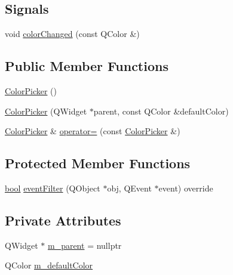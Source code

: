 \subsection*{Signals}
\begin{DoxyCompactItemize}
\item 
void \mbox{\hyperlink{class_q_g_b_a_1_1_color_picker_a232b00f21af8dfea674cb9c7b5858673}{color\+Changed}} (const Q\+Color \&)
\end{DoxyCompactItemize}
\subsection*{Public Member Functions}
\begin{DoxyCompactItemize}
\item 
\mbox{\hyperlink{class_q_g_b_a_1_1_color_picker_a42a95c3d82cee90a8fcd8fabc9c19869}{Color\+Picker}} ()
\item 
\mbox{\hyperlink{class_q_g_b_a_1_1_color_picker_a432d68deaec0eff41429930777951569}{Color\+Picker}} (Q\+Widget $\ast$parent, const Q\+Color \&default\+Color)
\item 
\mbox{\hyperlink{class_q_g_b_a_1_1_color_picker}{Color\+Picker}} \& \mbox{\hyperlink{class_q_g_b_a_1_1_color_picker_a4459c0f48bf42c5a672b3fdf71853639}{operator=}} (const \mbox{\hyperlink{class_q_g_b_a_1_1_color_picker}{Color\+Picker}} \&)
\end{DoxyCompactItemize}
\subsection*{Protected Member Functions}
\begin{DoxyCompactItemize}
\item 
\mbox{\hyperlink{libretro_8h_a4a26dcae73fb7e1528214a068aca317e}{bool}} \mbox{\hyperlink{class_q_g_b_a_1_1_color_picker_afe3820464dccd855c22def995bb05d52}{event\+Filter}} (Q\+Object $\ast$obj, Q\+Event $\ast$event) override
\end{DoxyCompactItemize}
\subsection*{Private Attributes}
\begin{DoxyCompactItemize}
\item 
Q\+Widget $\ast$ \mbox{\hyperlink{class_q_g_b_a_1_1_color_picker_a2e858b88d7606a43d17cb760bd080cdf}{m\+\_\+parent}} = nullptr
\item 
Q\+Color \mbox{\hyperlink{class_q_g_b_a_1_1_color_picker_a40fbcbeebb0811f96489d9f729f3ceae}{m\+\_\+default\+Color}}
\end{DoxyCompactItemize}


